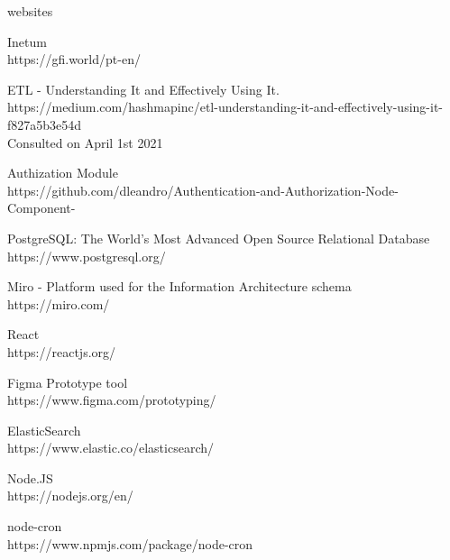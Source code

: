 \documentclass[a4paper,twoside,10pt]{report}
\begin{document}
\begin{thebibliography} {websites}

 Inetum\\ https://gfi.world/pt-en/

 ETL - Understanding It and Effectively Using It.\\
https://medium.com/hashmapinc/etl-understanding-it-and-effectively-using-it-f827a5b3e54d\\
Consulted on April 1st 2021

 Authization Module\\
https://github.com/dleandro/Authentication-and-Authorization-Node-Component-

 PostgreSQL: The World's Most Advanced Open Source Relational Database\\
https://www.postgresql.org/

 Miro - Platform used for the Information Architecture schema\\
https://miro.com/

 React\\ https://reactjs.org/

 Figma Prototype tool\\https://www.figma.com/prototyping/

 ElasticSearch \\ https://www.elastic.co/elasticsearch/

 Node.JS \\ https://nodejs.org/en/

 node-cron \\ https://www.npmjs.com/package/node-cron
\end{thebibliography}
\end{document}
